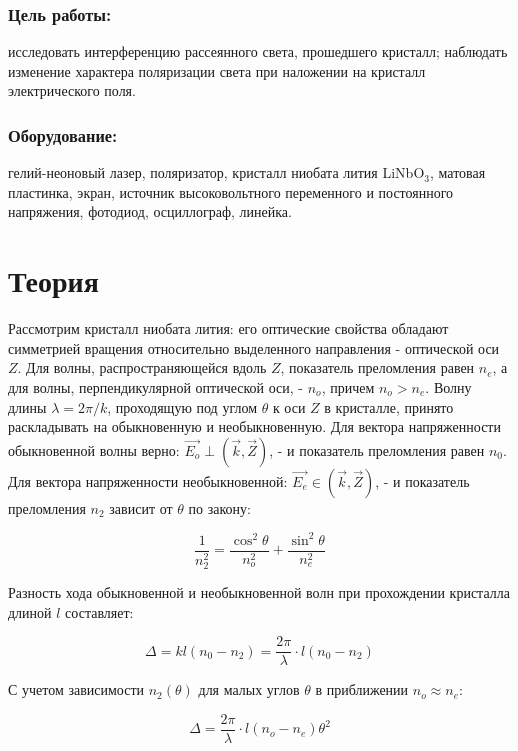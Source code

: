 \documentclass[a4paper,12pt]{article}
\begin{document}
\subsubsection*{Цель работы:}исследовать интерференцию рассеянного света, прошедшего кристалл; наблюдать изменение характера поляризации света при наложении на кристалл электрического поля.

\subsubsection*{Оборудование:} гелий-неоновый лазер, поляризатор, кристалл ниобата лития LiNbO$_3$, матовая пластинка, экран, источник высоковольтного переменного и постоянного напряжения, фотодиод, осциллограф, линейка.

\section*{Теория}

Рассмотрим кристалл ниобата лития: его оптические свойства обладают симметрией вращения относительно выделенного направления - оптической оси $Z$. Для волны, распространяющейся вдоль $Z$, показатель преломления равен $n_e$, а для волны, перпендикулярной оптической оси, - $n_o$, причем $n_o > n_e$. Волну длины $\lambda = 2\pi/k$, проходящую под углом $\theta$ к оси $Z$ в кристалле, принято раскладывать на обыкновенную и необыкновенную. Для вектора напряженности обыкновенной волны верно: $\overrightarrow{E_o} \perp (\overrightarrow{k}, \overrightarrow{Z})$, - и показатель преломления равен $n_0$. Для вектора напряженности необыкновенной: $\overrightarrow{E_e} \in (\overrightarrow{k}, \overrightarrow{Z})$, - и показатель преломления $n_2$ зависит от $\theta$ по закону:

\[ \frac{1}{n_2^2} = \frac{\cos^2\theta}{n_o^2} + \frac{\sin^2\theta}{n_e^2} \]

Разность хода обыкновенной и необыкновенной волн при прохождении кристалла длиной $l$ составляет: 

\[ \Delta = kl(n_0 - n_2) = \frac{2\pi}{\lambda} \cdot l (n_0 - n_2) \]

С учетом зависимости $n_2(\theta)$ для малых углов $\theta$ в приближении $n_o \approx n_e$: 

\begin{equation}
\Delta = \frac{2\pi}{\lambda}\cdot l (n_o - n_e)\theta^2 
\end{equation}
\end{document}
